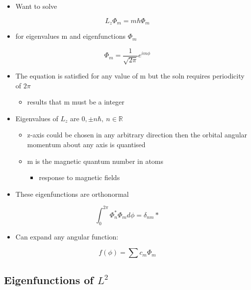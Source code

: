 \documentclass[a4paper,11pt,normalem]{article}
\begin{document}
\begin{itemize}
\item
  Want to solve
\end{itemize}

\[
    L_z \Phi_m = m\hbar\Phi_m
\]

\begin{itemize}
\item
  for eigenvalues m and eigenfunctions \(\Phi_m\)
\end{itemize}

\[
    \Phi_m = \frac{1}{\sqrt{2\pi}}e^{im\phi}
\]

\begin{itemize}
\item
  The equation is satisfied for any value of m but the soln requires
  periodicity of \(2\pi\)
  \begin{itemize}
  \item
    results that m must be a integer
  \end{itemize}
\item
  Eigenvalues of \(L_z\) are \(0, \pm n\hbar,~ n \in \mathbb{R}\)
  \begin{itemize}
  \item
    z-axis could be chosen in any arbitrary direction then the orbital
    angular momentum about any axis is quantised
  \item
    m is the magnetic quantum number in atoms
    \begin{itemize}
    \item
      response to magnetic fields
    \end{itemize}
  \end{itemize}
\item
  These eigenfunctions are orthonormal
\end{itemize}

\[
    \int_{0}^{2\pi} \Phi_{n}^{*} \Phi_{m} d\phi = \delta_{nm}*
\]

\begin{itemize}
\item
  Can expand any angular function:
\end{itemize}

\[
    f(\phi) = \sum c_m \Phi_m
\]

\subsection{\texorpdfstring{Eigenfunctions of
\(L^2\)}{Eigenfunctions of L\^{}2}}\label{eigenfunctions-of-l2}
\end{document}
